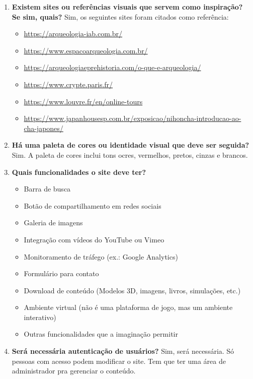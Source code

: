 \begin{enumerate}
    \item \textbf{Existem sites ou referências visuais que servem como inspiração? Se sim, quais?}  
    Sim, os seguintes sites foram citados como referência:  
    \begin{itemize}
        \item \url{https://arqueologia-iab.com.br/}  
        \item \url{https://www.espacoarqueologia.com.br/}  
        \item \url{https://arqueologiaeprehistoria.com/o-que-e-arqueologia/}  
        \item \url{https://www.crypte.paris.fr/}  
        \item \url{https://www.louvre.fr/en/online-tours}  
        \item \url{https://www.japanhousesp.com.br/exposicao/nihoncha-introducao-ao-cha-japones/}
    \end{itemize}

    \item \textbf{Há uma paleta de cores ou identidade visual que deve ser seguida?}  
    Sim. A paleta de cores inclui tons ocres, vermelhos, pretos, cinzas e brancos.

    \item \textbf{Quais funcionalidades o site deve ter?}  
    \begin{itemize}
        \item Barra de busca  
        \item Botão de compartilhamento em redes sociais  
        \item Galeria de imagens  
        \item Integração com vídeos do YouTube ou Vimeo  
        \item Monitoramento de tráfego (ex.: Google Analytics)  
        \item Formulário para contato  
        \item Download de conteúdo (Modelos 3D, imagens, livros, simulações, etc.)  
        \item Ambiente virtual (não é uma plataforma de jogo, mas um ambiente interativo)  
        \item Outras funcionalidades que a imaginação permitir
    \end{itemize}

    \item \textbf{Será necessária autenticação de usuários?}  
    Sim, será necessária. Só pessoas com acesso podem modificar o site. Tem que ter uma área de administrador pra gerenciar o conteúdo.


\end{enumerate}
